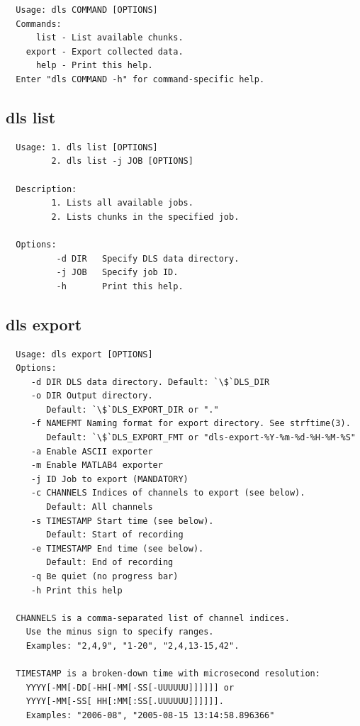 \documentclass[a4paper,12pt,BCOR6mm,bibtotoc,idxtotoc]{scrbook}
\begin{document}
\begin{lstlisting}
  Usage: dls COMMAND [OPTIONS]
  Commands:
      list - List available chunks.
    export - Export collected data.
      help - Print this help.
  Enter "dls COMMAND -h" for command-specific help.
\end{lstlisting}


\subsection{dls list}

\begin{lstlisting}
  Usage: 1. dls list [OPTIONS]
         2. dls list -j JOB [OPTIONS]

  Description:
         1. Lists all available jobs.
         2. Lists chunks in the specified job.

  Options:
          -d DIR   Specify DLS data directory.
          -j JOB   Specify job ID.
          -h       Print this help.
\end{lstlisting}


\subsection{dls export}

\begin{lstlisting}
  Usage: dls export [OPTIONS]
  Options:
     -d DIR DLS data directory. Default: `\$`DLS_DIR
     -o DIR Output directory.
        Default: `\$`DLS_EXPORT_DIR or "."
     -f NAMEFMT Naming format for export directory. See strftime(3).
        Default: `\$`DLS_EXPORT_FMT or "dls-export-%Y-%m-%d-%H-%M-%S"
     -a Enable ASCII exporter
     -m Enable MATLAB4 exporter
     -j ID Job to export (MANDATORY)
     -c CHANNELS Indices of channels to export (see below).
        Default: All channels
     -s TIMESTAMP Start time (see below).
        Default: Start of recording
     -e TIMESTAMP End time (see below).
        Default: End of recording
     -q Be quiet (no progress bar)
     -h Print this help

  CHANNELS is a comma-separated list of channel indices.
    Use the minus sign to specify ranges.
    Examples: "2,4,9", "1-20", "2,4,13-15,42".

  TIMESTAMP is a broken-down time with microsecond resolution:
    YYYY[-MM[-DD[-HH[-MM[-SS[-UUUUUU]]]]]] or
    YYYY[-MM[-SS[ HH[:MM[:SS[.UUUUUU]]]]]].
    Examples: "2006-08", "2005-08-15 13:14:58.896366"
\end{lstlisting}
\end{document}
